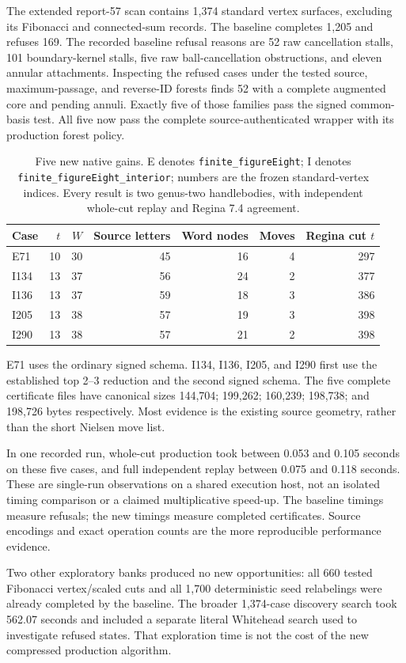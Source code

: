 The extended report-57 scan contains 1,374 standard vertex surfaces,
excluding its Fibonacci and connected-sum records. The baseline completes
1,205 and refuses 169. The recorded baseline refusal reasons are 52 raw
cancellation stalls, 101 boundary-kernel stalls, five raw ball-cancellation
obstructions, and eleven annular attachments. Inspecting the refused cases
under the tested source, maximum-passage, and reverse-ID forests finds 52
with a complete augmented core and pending annuli. Exactly five of those
families pass the signed common-basis test. All five now pass the complete
source-authenticated wrapper with its production forest policy.

\begin{table}[ht]
\centering\small
\begin{tabular}{@{}lrrrrrr@{}}
\toprule
Case & $t$ & $W$ & Source letters & Word nodes & Moves & Regina cut $t$\\
\midrule
E71 & 10 & 30 & 45 & 16 & 4 & 297\\
I134 & 13 & 37 & 56 & 24 & 2 & 377\\
I136 & 13 & 37 & 59 & 18 & 3 & 386\\
I205 & 13 & 38 & 57 & 19 & 3 & 398\\
I290 & 13 & 38 & 57 & 21 & 2 & 398\\
\bottomrule
\end{tabular}
\caption{Five new native gains. E denotes \texttt{finite\_figureEight}; I
denotes \texttt{finite\_figureEight\_interior}; numbers are the frozen
standard-vertex indices. Every result is two genus-two handlebodies, with
independent whole-cut replay and Regina 7.4 agreement.}
\label{tab:native}
\end{table}

E71 uses the ordinary signed schema. I134, I136, I205, and I290 first use
the established top 2--3 reduction and the second signed schema. The five
complete certificate files have canonical sizes 144,704; 199,262; 160,239;
198,738; and 198,726 bytes respectively. Most evidence is the existing
source geometry, rather than the short Nielsen move list.

In one recorded run, whole-cut production took between 0.053 and 0.105
seconds on these five cases, and full independent replay between 0.075 and
0.118 seconds. These are single-run observations on a shared execution
host, not an isolated timing comparison or a claimed multiplicative speed-up.
The baseline timings measure refusals; the new timings measure completed
certificates. Source encodings and exact operation counts are the more
reproducible performance evidence.

Two other exploratory banks produced no new opportunities: all 660 tested
Fibonacci vertex/scaled cuts and all 1,700 deterministic seed relabelings
were already completed by the baseline. The broader 1,374-case discovery
search took 562.07 seconds and included a separate literal Whitehead search
used to investigate refused states. That exploration time is not the cost
of the new compressed production algorithm.
